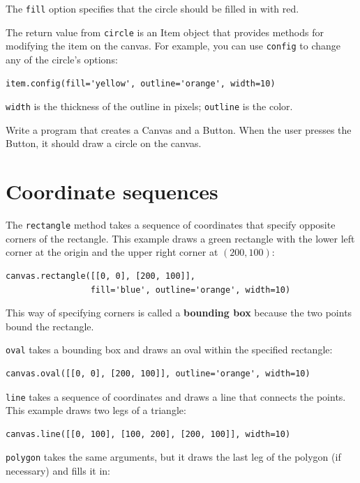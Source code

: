 \documentclass[10pt]{book}
\begin{document}
\begin{CJK}{UTF8}{gbsn}
The {\tt fill} option specifies that the circle should be filled
in with red.

The return value from {\tt circle} is an Item object that
provides methods for modifying the item on the canvas.  For
example, you can use {\tt config} to change any of the circle's
options:

\begin{verbatim}
item.config(fill='yellow', outline='orange', width=10)
\end{verbatim}
%
{\tt width} is the thickness of the outline in pixels;
{\tt outline} is the color.

\begin{exercise}
\label{circle}

Write a program that creates a Canvas and a Button.  When the
user presses the Button, it should draw a circle on the canvas.

\end{exercise}


\section{Coordinate sequences}

The {\tt rectangle} method takes a sequence of coordinates that
specify opposite corners of the rectangle.  This example
draws a green rectangle with the lower left corner at the origin
and the upper right corner at $(200,100)$:

\begin{verbatim}
canvas.rectangle([[0, 0], [200, 100]], 
                 fill='blue', outline='orange', width=10)
\end{verbatim}
%
This way of specifying corners is called
a {\bf bounding box} because the two points
bound the rectangle.

{\tt oval} takes a bounding box and draws an oval
within the specified rectangle:

\begin{verbatim}
canvas.oval([[0, 0], [200, 100]], outline='orange', width=10)
\end{verbatim}
%
{\tt line} takes a sequence of coordinates and draws
a line that connects the points.  This example draws two legs
of a triangle:

\begin{verbatim}
canvas.line([[0, 100], [100, 200], [200, 100]], width=10)
\end{verbatim}
%
{\tt polygon} takes the same arguments, but it draws the last
leg of the polygon (if necessary) and fills it in:


\end{CJK}
\end{document}
